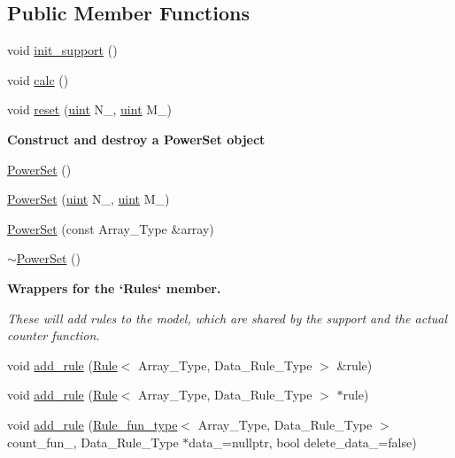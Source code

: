 \subsection*{Public Member Functions}
\begin{DoxyCompactItemize}
\item 
void \hyperlink{class_power_set_a8eefc9606c6339938a8d9adcd0d7e153}{init\+\_\+support} ()
\item 
void \hyperlink{class_power_set_ad3b707294498105b2cc1a04017cc96d2}{calc} ()
\item 
void \hyperlink{class_power_set_aba11dd8802cd2eb529c7c30b55994248}{reset} (\hyperlink{typedefs_8hpp_a91ad9478d81a7aaf2593e8d9c3d06a14}{uint} N\+\_\+, \hyperlink{typedefs_8hpp_a91ad9478d81a7aaf2593e8d9c3d06a14}{uint} M\+\_\+)
\end{DoxyCompactItemize}
\begin{Indent}\textbf{ Construct and destroy a Power\+Set object}\par
\begin{DoxyCompactItemize}
\item 
\hyperlink{class_power_set_a095815ccc44c88e0da73d92c6b5cf5f3}{Power\+Set} ()
\item 
\hyperlink{class_power_set_abf6ac4224da7ae4d187d0d63833615b1}{Power\+Set} (\hyperlink{typedefs_8hpp_a91ad9478d81a7aaf2593e8d9c3d06a14}{uint} N\+\_\+, \hyperlink{typedefs_8hpp_a91ad9478d81a7aaf2593e8d9c3d06a14}{uint} M\+\_\+)
\item 
\hyperlink{class_power_set_acc20a68ff11aa1891d9a0676ed50808f}{Power\+Set} (const Array\+\_\+\+Type \&array)
\item 
\hyperlink{class_power_set_a89a176c9517e81a066adffad3c46aba5}{$\sim$\+Power\+Set} ()
\end{DoxyCompactItemize}
\end{Indent}
\begin{Indent}\textbf{ Wrappers for the `\+Rules` member.}\par
{\em These will add rules to the model, which are shared by the support and the actual counter function. }\begin{DoxyCompactItemize}
\item 
void \hyperlink{class_power_set_a00ee318a40da91bcf0bff79bf71454ab}{add\+\_\+rule} (\hyperlink{class_rule}{Rule}$<$ Array\+\_\+\+Type, Data\+\_\+\+Rule\+\_\+\+Type $>$ \&rule)
\item 
void \hyperlink{class_power_set_a6cb8fb8f09b4c190e2ac6c07daa1241e}{add\+\_\+rule} (\hyperlink{class_rule}{Rule}$<$ Array\+\_\+\+Type, Data\+\_\+\+Rule\+\_\+\+Type $>$ $\ast$rule)
\item 
void \hyperlink{class_power_set_aae5eae12186fff037efa3884ac2b3dcc}{add\+\_\+rule} (\hyperlink{typedefs_8hpp_a99982bdca40c23ca6f901c8e66da78a1}{Rule\+\_\+fun\+\_\+type}$<$ Array\+\_\+\+Type, Data\+\_\+\+Rule\+\_\+\+Type $>$ count\+\_\+fun\+\_\+, Data\+\_\+\+Rule\+\_\+\+Type $\ast$data\+\_\+=nullptr, bool delete\+\_\+data\+\_\+=false)
\end{DoxyCompactItemize}
\end{Indent}

